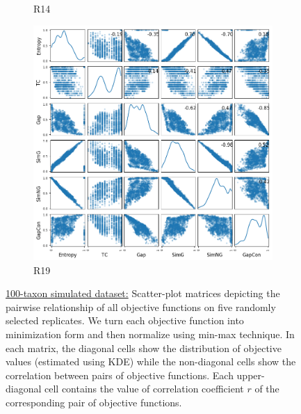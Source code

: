 \begin{figure}[!htbp]
\begin{adjustwidth}{-1cm}{-1cm}
\begin{subfigure}{0.35\textwidth}
			\caption{R14}
		\end{subfigure}
		\begin{subfigure}{0.35\textwidth}
			\includegraphics[width=\columnwidth]{Figure/6-obj-old/R19/fig/scatter_mattrix}
			\caption{R19}
		\end{subfigure}
		\caption{\underline{100-taxon simulated dataset:} Scatter-plot matrices depicting the pairwise relationship of all objective functions on five randomly selected replicates. We turn each objective function into minimization form and then normalize using min-max technique. In each matrix, the diagonal cells show the distribution of objective values (estimated using KDE) while the non-diagonal cells show the correlation between pairs of objective functions. Each upper-diagonal cell contains the value of correlation coefficient $r$ of the corresponding pair of objective functions.}
		\label{fig:new_nature_obj}
	\end{adjustwidth}
\end{figure}
